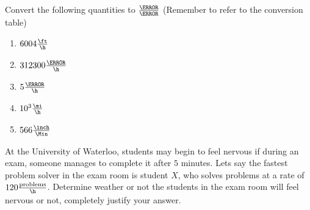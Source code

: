 \documentclass[12pt]{article} %
\begin{document}
    \renewcommand*{\coursecode}{Physics Homework} %
    \renewcommand*{\assgnnumber}{2} %
    \renewcommand*{\submdate}{August 14, 2021} %
    \renewcommand*{\studentfname}{Abdullah} %
    \renewcommand*{\studentlname}{Zubair} %

    \renewcommand\qedsymbol{$\blacksquare$}
    \setfigpath
    \pagestyle{crowdmark}
    \fancyhfoffset[L,O]{0pt} %
\begin{qstn}[1] %
 Convert the following quantities to $\frac{\m}{\s}$ (Remember to refer to the conversion table)
 \begin{enumerate}
\item $6004 \frac{\ft}{\h}$
 \vspace*{3cm}
 \item $312300 \frac{\cm}{\h}$
 \vspace*{3cm}
 \item $5 \frac{\km}{\h}$
 \vspace*{3cm}
 \item $10^3 \frac{\mi}{\h}$
 \vspace*{3cm}
 \item $566 \frac{\inch}{\Min}$
 \vspace*{3cm}
 \end{enumerate}
 \end{qstn}


 \begin{qstn}[2]
At the University of Waterloo, students may begin to feel nervous if during an exam, someone manages to complete it after $5$ minutes. Lets say the fastest problem solver in the exam room is student $X$, who solves problems at a rate of $120 \frac{\text{problems}}{\h}$. Determine weather or not the students in the exam room will feel nervous or not, completely justify your answer.
\end{qstn}
\end{document}
